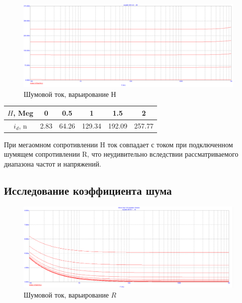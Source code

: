 \documentclass[a4paper, 12pt]{article}%
\begin{document}
\begin{enumerate}
\begin{figure}[h!]
    \centering
    \includegraphics[scale=0.3]{images/mod6_1_3.png}
    \caption{Шумовой ток, варьирование Н}
    \label{fig:m613}
\end{figure}

\begin{center}
\begin{table}[h!]
    \centering
    \begin{tabular}{|c|c|c|c|c|c|}
    \hline
        $H$, Meg & 0 & 0.5 & 1 & 1.5 & 2\\ \hline
        $i_d$, n & 2.83 & 64.26 & 129.34 & 192.09 & 257.77 \\ \hline
    \end{tabular}
    \label{tab:mt613}
\end{table}
\end{center}

При мегаомном сопротивлении H ток совпадает с током при подключенном шумящем сопротивлении R, что неудивительно вследствии рассматриваемого диапазона частот и напряжений.

\subsection*{Исследование коэффициента шума}

\begin{figure}[h!]
    \centering
    \includegraphics[scale=0.225]{images/2023-11-23_20-25-02.png}
    \caption{Шумовой ток, варьирование $R$}
    \label{fig:m612}
\end{figure}


\end{enumerate}
\end{document}
